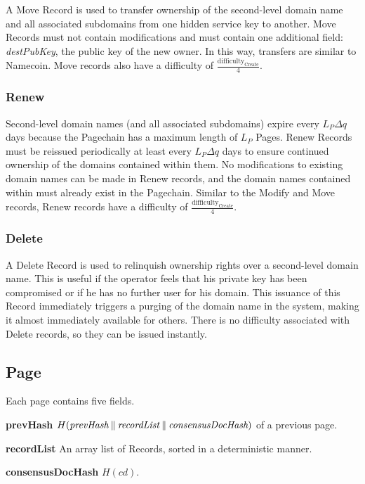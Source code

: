 A Move Record is used to transfer ownership of the second-level domain name and all associated subdomains from one hidden service key to another. Move Records must not contain modifications and must contain one additional field: \emph{destPubKey}, the public key of the new owner. In this way, transfers are similar to Namecoin. Move records also have a difficulty of $ \frac{\textrm{difficulty}_{\textrm{Create}}}{4} $.

\subsubsection{Renew}

Second-level domain names (and all associated subdomains) expire every $ L_{P}\Delta q $ days because the Pagechain has a maximum length of $ L_{P} $ Pages. Renew Records must be reissued periodically at least every $ L_{P}\Delta q $ days to ensure continued ownership of the domains contained within them. No modifications to existing domain names can be made in Renew records, and the domain names contained within must already exist in the Pagechain. Similar to the Modify and Move records, Renew records have a difficulty of $ \frac{\textrm{difficulty}_{\textrm{Create}}}{4} $.

\subsubsection{Delete}

A Delete Record is used to relinquish ownership rights over a second-level domain name. This is useful if the operator feels that his private key has been compromised or if he has no further user for his domain. This issuance of this Record immediately triggers a purging of the domain name in the system, making it almost immediately available for others. There is no difficulty associated with Delete records, so they can be issued instantly.

\subsection{Page}

Each page contains five fields.

\textbf{prevHash} $ H(\emph{prevHash} \mathbin{\|}  \emph{recordList} \mathbin{\|} \emph{consensusDocHash}) $ of a previous page.

\textbf{recordList} An array list of Records, sorted in a deterministic manner.

\textbf{consensusDocHash} $ H(\mathit{cd}) $.

